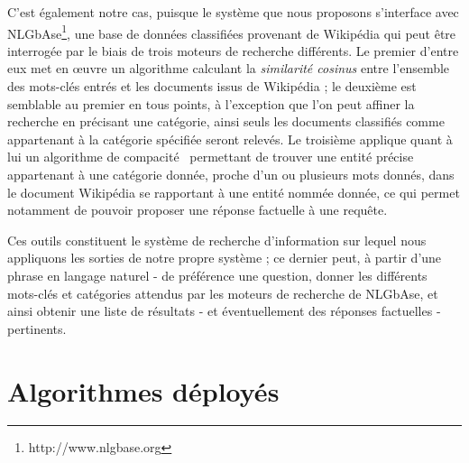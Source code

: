 \documentclass[10pt,a4paper]{article}
\begin{document}
\par C'est également notre cas, puisque le système que nous proposons s'interface avec NLGbAse\footnote{http://www.nlgbase.org}, une base de données classifiées provenant de Wikipédia qui peut être interrogée par le biais de trois moteurs de recherche différents. Le premier d'entre eux met en {\oe}uvre un algorithme calculant la \emph{similarité cosinus} entre l'ensemble des mots-clés entrés et les documents issus de Wikipédia ; le deuxième est semblable au premier en tous points, à l'exception que l'on peut affiner la recherche en précisant une catégorie, ainsi seuls les documents classifiés comme appartenant à la catégorie spécifiée seront relevés. Le troisième applique quant à lui un algorithme de compacité~\cite{gillard:paper} permettant de trouver une entité précise appartenant à une catégorie donnée, proche d'un ou plusieurs mots donnés, dans le document Wikipédia se rapportant à une entité nommée donnée, ce qui permet notamment de pouvoir proposer une réponse factuelle à une requête.

\par Ces outils constituent le système de recherche d'information sur lequel nous appliquons les sorties de notre propre système ; ce dernier peut, à partir d'une phrase en langage naturel - de préférence une question, donner les différents mots-clés et catégories attendus par les moteurs de recherche de NLGbAse, et ainsi obtenir une liste de résultats - et éventuellement des réponses factuelles - pertinents.




\section{Algorithmes déployés}\label{details}
\end{document}
